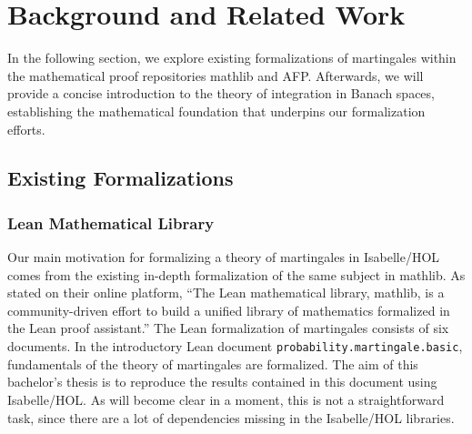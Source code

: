 ﻿%

\chapter{Background and Related Work}\label{chapter:background}

In the following section, we explore existing formalizations of martingales within the mathematical proof repositories \textsf{mathlib} and \textsf{AFP}. Afterwards, we will provide a concise introduction to the theory of integration in Banach spaces, establishing the mathematical foundation that underpins our formalization efforts.

\section{Existing Formalizations}

\subsection{Lean Mathematical Library}

Our main motivation for formalizing a theory of martingales in Isabelle/HOL comes from the existing in-depth formalization of the same subject in \textsf{mathlib}. As stated on their online platform, ``The Lean mathematical library, \textsf{mathlib}, is a community-driven effort to build a unified library of mathematics formalized in the Lean proof assistant.'' The Lean formalization of martingales consists of six documents. In the introductory Lean document \texttt{probability.martingale.basic}, fundamentals of the theory of martingales are formalized. The aim of this bachelor's thesis is to reproduce the results contained in this document using Isabelle/HOL. As will become clear in a moment, this is not a straightforward task, since there are a lot of dependencies missing in the Isabelle/HOL libraries.

